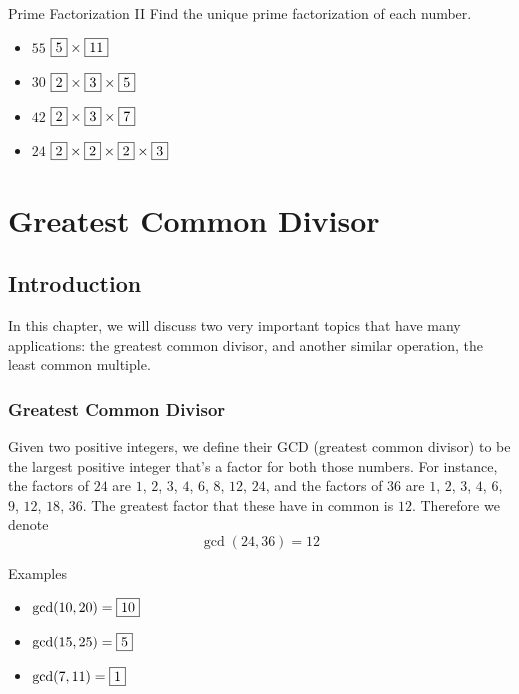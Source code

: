 \documentclass[a4paper,10pt]{report}
\begin{document}
\begin{problem}{Prime Factorization II}
 Find the unique prime factorization of each number.

 \begin{itemize}
  \item \(55\) \hfill \(\Ans{5} \times \Ans{11}\)
  \item \(30\) \hfill \(\Ans{2} \times \Ans{3} \times \Ans{5}\)
  \item \(42\) \hfill \(\Ans{2} \times \Ans{3} \times \Ans{7}\)
  \item \(24\) \hfill \(\Ans{2} \times \Ans{2} \times \Ans{2} \times \Ans{3}\)
 \end{itemize}
\end{problem}


\chapter{Greatest Common Divisor}

\section{Introduction}

In this chapter, we will discuss two very important
topics that have many applications: the greatest common divisor, and another
similar operation, the least common multiple.

\subsection{Greatest Common Divisor}

Given two positive integers, we define their GCD (greatest common divisor) to
be the largest positive integer that's a factor for both those numbers. For
instance, the factors of \(24\) are \(1\), \(2\), \(3\), \(4\), \(6\), \(8\),
\(12\), \(24\), and the factors of \(36\) are \(1\), \(2\), \(3\), \(4\),
\(6\), \(9\), \(12\), \(18\), \(36\). The greatest factor that these have in
common is \(12\). Therefore we denote \[ \gcd(24, 36) = 12 \]

\begin{problem}{Examples}
 \begin{itemize}
  \item \(\gcd(10, 20) = \Ans{10}\)
  \item \(\gcd(15, 25) = \Ans{5}\)
  \item \(\gcd(7, 11) = \Ans{1}\)
 \end{itemize}
\end{problem}
\end{document}
